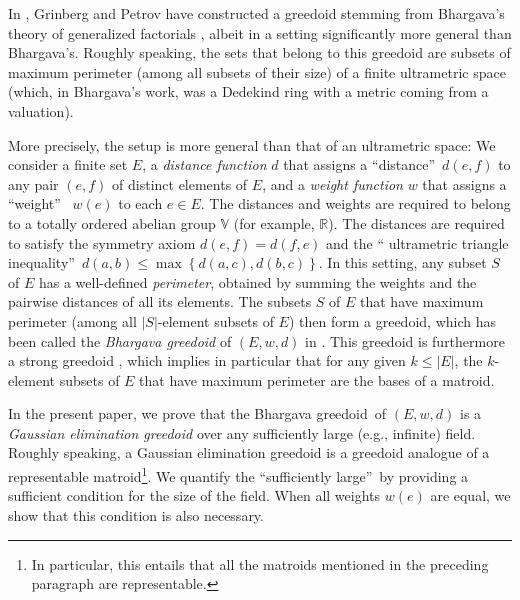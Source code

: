 \documentclass[numbers=enddot,12pt,final,onecolumn,notitlepage]{scrartcl}%
\theoremstyle{definition}
\renewcommand{\leq}{\leqslant}
\theoremstyle{plainsl}
\begin{document}
In \cite{GriPet19}, Grinberg and Petrov have constructed a greedoid stemming
from Bhargava's theory of generalized factorials \cite[\S 2]{Bharga97}, albeit
in a setting significantly more general than Bhargava's. Roughly speaking, the
sets that belong to this greedoid are subsets of maximum perimeter (among all
subsets of their size) of a finite ultrametric space (which, in Bhargava's
work, was a Dedekind ring with a metric coming from a valuation).

More precisely, the setup is more general than that of an ultrametric space:
We consider a finite set $E$, a \emph{distance function} $d$ that assigns a
\textquotedblleft distance\textquotedblright\ $d\left(  e,f\right)  $ to any
pair $\left(  e,f\right)  $ of distinct elements of $E$, and a \emph{weight
function} $w$ that assigns a \textquotedblleft weight\textquotedblright%
\ $w\left(  e\right)  $ to each $e\in E$. The distances and weights are
required to belong to a totally ordered abelian group $\mathbb{V}$ (for
example, $\mathbb{R}$). The distances are required to satisfy the symmetry
axiom $d\left(  e,f\right)  =d\left(  f,e\right)  $ and the \textquotedblleft
ultrametric triangle inequality\textquotedblright\ $d\left(  a,b\right)
\leq\max\left\{  d\left(  a,c\right)  ,d\left(  b,c\right)  \right\}  $. In
this setting, any subset $S$ of $E$ has a well-defined \emph{perimeter},
obtained by summing the weights and the pairwise distances of all its
elements. The subsets $S$ of $E$ that have maximum perimeter (among all
$\left\vert S\right\vert $-element subsets of $E$) then form a greedoid, which
has been called the \emph{Bhargava greedoid} of $\left(  E,w,d\right)  $ in
\cite{GriPet19}. This greedoid is furthermore a strong greedoid \cite[Theorem
6.1]{GriPet19}, which implies in particular that for any given $k\leq
\left\vert E\right\vert $, the $k$-element subsets of $E$ that have maximum
perimeter are the bases of a matroid.

In the present paper, we prove that the Bhargava greedoid\ of $\left(
E,w,d\right)  $ is a \emph{Gaussian elimination greedoid} over any
sufficiently large (e.g., infinite) field. Roughly speaking, a Gaussian
elimination greedoid is a greedoid analogue of a representable
matroid\footnote{In particular, this entails that all the matroids mentioned
in the preceding paragraph are representable.}. We quantify the
\textquotedblleft sufficiently large\textquotedblright\ by providing a
sufficient condition for the size of the field. When all weights $w\left(
e\right)  $ are equal, we show that this condition is also necessary.
\end{document}
